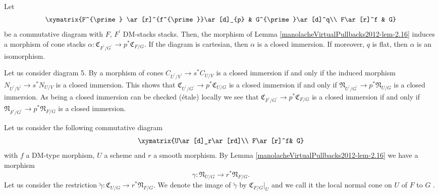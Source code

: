 \begin{proposition}\label{manolacheVirtualPullbacks2012-prop-2.18}
\label{manolacheVirtualPullbacks2012-dmincl}
 Let \begin{equation*}
 \xymatrix {F^{\prime} \ar[r]^{f^{\prime}}\ar[d]_{p} & G^{\prime}\ar[d]^q\\
             F\ar[r]^f & G}
\end{equation*}
be a commutative diagram with $F$, $F^{\prime}$ DM-stacks stacks. Then, the morphism of Lemma \ref{manolacheVirtualPullbacks2012-lem-2.16} induces a morphism of cone stacks $\alpha:\mathfrak{C}_{F^{\prime}/G^{\prime}}\rightarrow p^*\mathfrak{C}_{F/G}$. If the diagram is cartesian, then $\alpha$ is a closed immersion. If moreover, $q$ is flat, then $\alpha$ is an isomorphism.
\end{proposition}

\begin{remark}\label{manolacheVirtualPullbacks2012-rem-2.19}
\label{manolacheVirtualPullbacks2012-injsurj}
Let us consider diagram 5. By  \cite{bf} a morphism of cones $C_{U^{\prime}/V^{\prime}}\to s^*C_{U/V}$ is a closed immersion if and only if the induced morphism $N_{U^{\prime}/V^{\prime}}\to s^*N_{U/V}$ is a closed immersion. This shows that $\mathfrak{C}_{U^{\prime}/G^{\prime}}\rightarrow p^*\mathfrak{C}_{U/G}$ is a closed immersion if and only if $\mathfrak{N}_{U^{\prime}/G^{\prime}}\rightarrow p^*\mathfrak{N}_{U/G}$ is a closed immersion. As being a closed immersion can be checked (\'etale) locally we see that $\mathfrak{C}_{F^{\prime}/G^{\prime}}\rightarrow p^*\mathfrak{C}_{F/G}$ is a closed immersion if and only if $\mathfrak{N}_{F^{\prime}/G^{\prime}}\rightarrow p^*\mathfrak{N}_{F/G}$ is a closed immersion.
\end{remark}

\begin{construct}\label{manolacheVirtualPullbacks2012-constr-2.20}
\label{manolacheVirtualPullbacks2012-locart} Let us consider the following commutative diagram
\begin{equation}\label{manolacheVirtualPullbacks2012-artincones}
 \xymatrix {U\ar[d]_r\ar[rd]\\
             F\ar[r]^f& G}
\end{equation}
with $f$ a DM-type morphism, $U$ a scheme and $r$ a smooth morphism. By Lemma \ref{manolacheVirtualPullbacks2012-lem-2.16} we have a morphism
\begin{equation}
\gamma:\mathfrak{N}_{U/G}\to r^*\mathfrak{N}_{F/G}.
\end{equation}
Let us consider the restriction $\tilde{\gamma}:\mathfrak{C}_{U/G}\to r^*\mathfrak{N}_{F/G}$. We denote the image of $\tilde{\gamma}$ by $\mathfrak{C}_{F/G}|_U$ and we call it the local normal cone on $U$ of $F$ to $G$ .
\end{construct}

